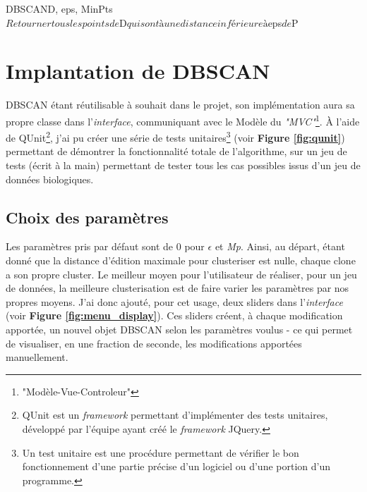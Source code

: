 \documentclass[pdftex,12pt,a4paper]{report}
\begin{document}
\begin{spacing}{1.2}
\begin{pseudocode}{DBSCAN}{D, eps, MinPts}
\\
	$Retourner tous les points de $D$ qui sont à une distance inférieure à $eps$ de $P
\ENDPROCEDURE
\end{pseudocode}

\section{Implantation de DBSCAN}

DBSCAN étant réutilisable à souhait dans le projet, son implémentation aura sa propre classe dans l'\textit{interface}, communiquant avec le Modèle du \textit{"MVC"}\footnote{"Modèle-Vue-Controleur"}.
À l'aide de QUnit\footnote{QUnit est un \textit{framework} permettant d'implémenter des tests unitaires, développé par l'équipe ayant créé le \textit{framework} JQuery.}, j'ai pu créer une série de tests unitaires\footnote{Un test unitaire est une procédure permettant de vérifier le bon fonctionnement d'une partie précise d'un logiciel ou d'une portion d'un programme.} (voir \textbf{Figure \ref{fig:qunit}}) permettant de démontrer la fonctionnalité totale de l'algorithme, sur un jeu de tests (écrit à la main) permettant de tester tous les cas possibles issus d'un jeu de données biologiques.

\subsection{Choix des paramètres}

Les paramètres pris par défaut sont de 0 pour $\epsilon$ et \textit{Mp}. Ainsi, au départ, étant donné que la distance d'édition maximale pour clusteriser est nulle, chaque clone a son propre cluster.
\newline
Le meilleur moyen pour l'utilisateur de réaliser, pour un jeu de données, la meilleure clusterisation est de faire varier les paramètres par nos propres moyens.
J'ai donc ajouté, pour cet usage, deux sliders dans l'\textit{interface} (voir \textbf{Figure \ref{fig:menu_display}}).
Ces sliders créent, à chaque modification apportée, un nouvel objet DBSCAN selon les paramètres voulus - ce qui permet de visualiser, en une fraction de seconde, les modifications apportées manuellement.


\end{spacing}
\end{document}
